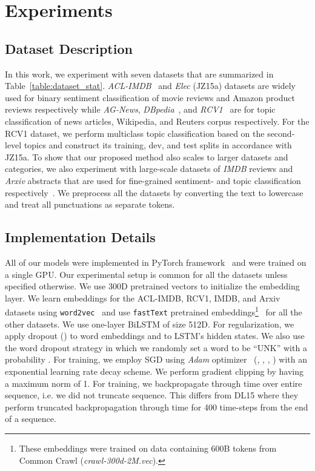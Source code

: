 \documentclass[letterpaper]{article}
\newcommand{\citep}{\cite}
\begin{document}
\section{Experiments}\label{sec:exp_setup}
\subsection*{Dataset Description}
In this work, we experiment with seven datasets that are summarized in Table~\ref{table:dataset_stat}. \emph{ACL-IMDB}~\citep{maas-EtAl:2011:ACL-HLT2011} and \emph{Elec} (JZ15a) datasets are widely used for binary sentiment classification of movie reviews and Amazon product reviews respectively while \emph{AG-News}, \emph{DBpedia}~\citep{zhang2015character}, and \emph{RCV1}~\citep{lewis2004rcv1} are for topic classification of news articles, Wikipedia, and Reuters corpus respectively. For the RCV1 dataset, we perform multiclass topic classification based on the second-level topics and construct its training, dev, and test splits in accordance with JZ15a. To show that our proposed method also scales to larger datasets and categories, we also experiment with large-scale datasets of \emph{IMDB} reviews and \emph{Arxiv} abstracts that are used for fine-grained sentiment- and topic classification respectively~\citep{sachan2018investigating}. We preprocess all the datasets by converting the text to lowercase and treat all punctuations as separate tokens.

\subsection*{Implementation Details}
All of our models were implemented in PyTorch framework~\citep{paszke2017automatic} and were trained on a single GPU. Our experimental setup is common for all the datasets unless specified otherwise. We use 300D pretrained vectors to initialize the embedding layer. We learn embeddings for the ACL-IMDB, RCV1, IMDB, and Arxiv datasets using \verb+word2vec+~\citep{mikolov2013distributed} and use \verb+fastText+ pretrained embeddings\footnote{These embeddings were trained on data containing 600B tokens from Common Crawl (\emph{crawl-300d-2M.vec}).}~\citep{mikolov2018advances} for all the other datasets. We use one-layer BiLSTM of size 512D. For regularization, we apply dropout () to word embeddings and to LSTM's hidden states. We also use the word dropout strategy in which we randomly set a word to be ``UNK'' with a probability . For training, we employ SGD using \emph{Adam} optimizer~\citep{DBLP:journals/corr/KingmaB14} (, , , ) with an exponential learning rate decay scheme. We perform gradient clipping by having a maximum  norm of 1. For training, we backpropagate through time over entire sequence, i.e. we did not truncate sequence. This differs  from DL15  where they perform truncated backpropagation through time for 400 time-steps from the end of a sequence.
\end{document}
